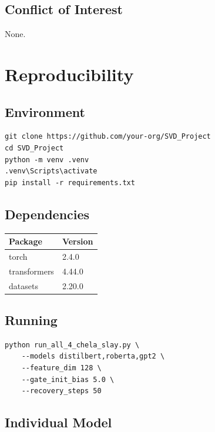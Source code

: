 \subsection{Conflict of Interest}

None.



\section{Reproducibility}

\subsection{Environment}

\begin{lstlisting}
git clone https://github.com/your-org/SVD_Project
cd SVD_Project
python -m venv .venv
.venv\Scripts\activate
pip install -r requirements.txt
\end{lstlisting}

\subsection{Dependencies}

\begin{table}[H]
\centering
\small
\begin{tabular}{ll}
\toprule
\textbf{Package} & \textbf{Version} \\
\midrule
torch & 2.4.0 \\
transformers & 4.44.0 \\
datasets & 2.20.0 \\
\bottomrule
\end{tabular}
\end{table}

\subsection{Running}

\begin{lstlisting}
python run_all_4_chela_slay.py \
    --models distilbert,roberta,gpt2 \
    --feature_dim 128 \
    --gate_init_bias 5.0 \
    --recovery_steps 50
\end{lstlisting}

\subsection{Individual Model}

